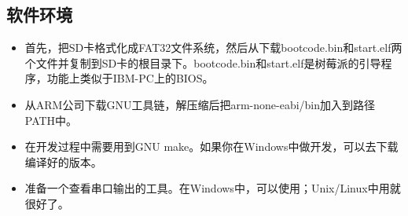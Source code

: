 \documentclass[main.tex]{subfiles}
\begin{document}
\begin{CJK*}{UTF8}{song}
\subsection{软件环境}
\begin{itemize}
\item 首先，把SD卡格式化成FAT32文件系统，然后从下载bootcode.bin和start.elf两个文件并复制到SD卡的根目录下。bootcode.bin和start.elf是树莓派的引导程序，功能上类似于IBM-PC上的BIOS。
\item 从ARM公司下载GNU工具链，解压缩后把arm-none-eabi/bin加入到路径PATH中。
\item 在开发过程中需要用到GNU make。如果你在Windows中做开发，可以去下载编译好的版本。
\item 准备一个查看串口输出的工具。在Windows中，可以使用；Unix/Linux中用就很好了。

\end{itemize}

\clearpage
\ifxetex\else\end{CJK*}\fi
\end{document}
